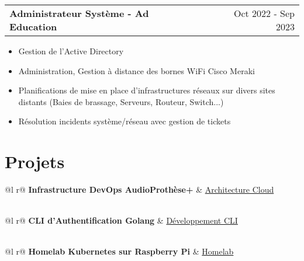 \documentclass[a4paper,11pt]{article}
\makeatletter
\newenvironment{joblong}[2]
    {
    \begin{tabularx}{\linewidth}{@{}l X r@{}}
    \textbf{#1} & \hfill &  #2 \\[2pt]
    \end{tabularx}
    \begin{minipage}[t]{\linewidth}
    \begin{itemize}[nosep,after=\strut, leftmargin=1em, itemsep=2pt,label=--]
    }
    {
    \end{itemize}
    \end{minipage}    
    }
\makeatother
\begin{document}
\begin{joblong}{Administrateur Système - Ad Education}{Oct 2022 - Sep 2023}
\item Gestion de l'Active Directory
\item Administration, Gestion à distance des bornes WiFi Cisco Meraki
\item Planifications de mise en place d'infrastructures réseaux sur divers sites distants (Baies de brassage, Serveurs, Routeur, Switch...)
\item Résolution incidents système/réseau avec gestion de tickets
\end{joblong}
  
\section{Projets}

\begin{tabularx}{\linewidth}{ @{}l r@{} }
\textbf{Infrastructure DevOps AudioProthèse+} & \hfill \href{https://github.com/cheng-alain}{Architecture Cloud} \\[2pt]
  \\
\end{tabularx}

\begin{tabularx}{\linewidth}{ @{}l r@{} }
\textbf{CLI d'Authentification Golang} & \hfill \href{https://github.com/cheng-alain}{Développement CLI} \\[2pt]
  \\
\end{tabularx}

\begin{tabularx}{\linewidth}{ @{}l r@{} }
\textbf{Homelab Kubernetes sur Raspberry Pi} & \hfill \href{https://github.com/cheng-alain}{Homelab} \\[2pt]
  \\
\end{tabularx}
\end{document}
